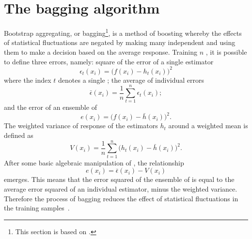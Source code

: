 \section{The bagging algorithm}
\label{sec:bdt:bag}
Bootstrap aggregating, or bagging\footnote{
  This section is based on .}, is a method of boosting whereby the effects of
statistical fluctuations are negated by making many independent \DTs and using them
to make a decision based on the average response.
Training $n$ \DTs, it is possible to define three errors, namely:
square of the error of a single estimator
\begin{equation}
  \epsilon_t(x_i) = \big(f(x_i)-h_t(x_i)\big)^2
  \label{eq:bdt:bag1}
\end{equation}
where the index $t$ denotes a single \DT;
the average of individual  errors
\begin{equation}
  \bar\epsilon(x_i) = \frac1n\sum_{t=1}^n\epsilon_t(x_i);
  \label{eq:bdt:bag2}
\end{equation}
and the  error of an ensemble of \DTs
\begin{equation}
  e(x_i) = \big(f(x_i)-\bar h(x_i)\big)^2.
  \label{eq:bdt:bag3}
\end{equation}
The weighted variance of response of the estimators $h_t$ around a weighted mean is defined as
\begin{equation}
  V(x_i) = \frac1n\sum_{t=1}^n\big(h_t(x_i) - \bar h(x_i)\big)^2.
  \label{eq:bdt:bag4}
\end{equation}
After some basic algebraic manipulation of , the relationship
\begin{equation}
  e(x_i) = \bar\epsilon(x_i) - V(x_i)
  \label{eq:bdt:bag5}
\end{equation}
emerges.
This means that the error squared of the ensemble of \DTs is equal to the average error squared of an
individual estimator, minus the weighted variance.
Therefore the process of bagging reduces the
effect of statistical fluctuations in the training samples~\cite{Krogh95neuralnetwork}.

